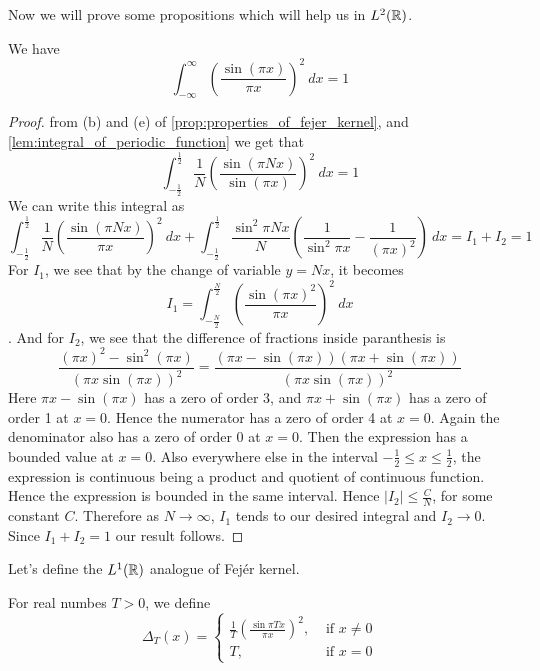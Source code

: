 Now we will prove some propositions which will help us in $L^2(\mathbb R)$. 
\begin{proposition}
  \label{prop:integral_of_sin(pi_x)^2/(pi_x)^2}
  We have $$\int_{-\infty}^{\infty} \left(\frac{\sin(\pi x)}{\pi x}\right)^2 \ dx = 1$$
\end{proposition}
\begin{proof}
  from (b) and (e) of \autoref{prop:properties_of_fejer_kernel}, and \autoref{lem:integral_of_periodic_function} we get that $$\int_{-\frac{1}{2}}^{\frac{1}{2}} \frac{1}{N} \left(\frac{\sin(\pi Nx)}{\sin (\pi x)}\right)^2 \ dx = 1$$
  We can write this integral as $$\int_{-\frac{1}{2}}^{\frac{1}{2}} \frac{1}{N} \left(\frac{\sin(\pi Nx)}{\pi x}\right)^2 \ dx + \int_{-\frac{1}{2}}^{\frac{1}{2}} \frac{\sin^2 \pi Nx}{N} \left( \frac{1}{\sin^2 \pi x} - \frac{1}{(\pi x)^2} \right) \ dx = I_1 + I_2 = 1 $$
  For $I_1$, we see that by the change of variable $y = Nx$, it becomes $$I_1 = \int_{-\frac{N}{2}}^{\frac{N}{2}} \left(\frac{\sin(\pi x)^2}{\pi x}\right)^2 \ dx $$. 
  And for $I_2$, we see that the difference of fractions inside paranthesis is $$\frac{(\pi x)^2 - \sin^2(\pi x)}{(\pi x \sin(\pi x))^2} = \frac{(\pi x - \sin(\pi x))(\pi x + \sin(\pi x))}{(\pi x \sin(\pi x))^2}$$
  Here $\pi x - \sin(\pi x)$ has a zero of order 3, and $\pi x + \sin(\pi x)$ has a zero of order 1 at $x=0$. Hence the numerator has a zero of order 4 at $x=0$. Again the denominator also has a zero of order 0 at $x=0$. Then the expression has a bounded value at $x=0$. Also everywhere else in the interval $-\frac{1}{2} \le x \le \frac{1}{2}$, the expression is continuous being a product and quotient of continuous function. Hence the expression is bounded in the same interval. Hence $|I_2| \le \frac{C}{N}$, for some constant $C$. Therefore as $N \to \infty$, $I_1$ tends to our desired integral and $I_2 \to 0$. Since $I_1 + I_2 = 1$ our result follows. 
\end{proof}

Let's define the $L^1(\mathbb R)$ analogue of Fej\'er kernel. 
\begin{definition}
  For real numbes $T > 0$, we define 
  \label{def:L1(R)_analogue_of_fejer_kernel}
  $$\Delta_T(x) =
  \begin{cases}
    \frac{1}{T}\left(\frac{\sin \pi Tx}{\pi x}\right)^2, &\text{ if }x \neq 0\\
    T, &\text{ if } x=0
  \end{cases}$$
\end{definition}

